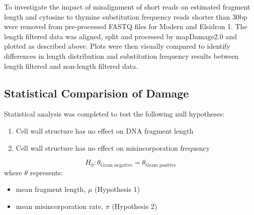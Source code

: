 \documentclass[12pt, a4paper]{article}
\begin{document}
To investigate the impact of misalignment of short reads on estimated fragment length and cytosine to thymine substitution frequency reads shorter than 30bp were removed from pre-processed FASTQ files for Modern and Elsidron 1. 
The length filtered data was aligned, split and processed by mapDamage2.0 and plotted as described above. 
Plots were then visually compared to identify differences in length distribution and substitution frequency results between length filtered and non-length filtered data.

%

\subsection{Statistical Comparision of Damage}

Statistical analysis was completed to test the following null hypotheses:

\begin{enumerate}
\item Cell wall structure has no effect on DNA fragment length
\item Cell wall structure has no effect on misincorporation frequency
\end{enumerate}
$$H_0: \theta_\text{Gram negative} = \theta_\text{Gram positive}$$ 
where $\theta$ represents:
\begin{itemize}
\item mean fragment length, $\mu$ (Hypothesis 1)
\item mean misincorporation rate, $\pi$ (Hypothesis 2)
\end{itemize}
\end{document}
